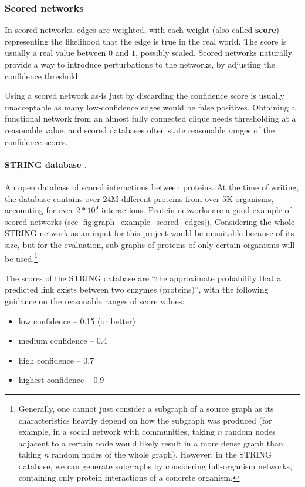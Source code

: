 \subsubsection*{Scored networks}\label{sec:scored_networks}

In scored networks, edges are weighted, with each weight (also called \textbf{score}) representing the likelihood that the edge is true in the real world.
The score is usually a real value between $0$ and $1$, possibly scaled.
Scored networks naturally provide a way to introduce perturbations to the networks, by adjusting the confidence threshold.

Using a scored network as-is just by discarding the confidence score is usually unacceptable as many low-confidence edges would be false positives.
Obtaining a functional network from an almost fully connected clique needs thresholding at a reasonable value, and scored databases often state reasonable ranges of the confidence scores.



\paragraph*{STRING database {\normalfont\cite{Szklarczyk2019}}.} An open database of scored interactions between proteins.
At the time of writing, the database contains over 24M different proteins from over 5K organisms, accounting for over $2 * 10^9$ interactions.
Protein networks are a good example of scored networks (see \cref{fig:graph_example_scored_edges}).
Considering the whole STRING network as an input for this project would be unsuitable because of its size, but for the evaluation, sub-graphs of proteins of only certain organisms will be used.\footnote{Generally, one cannot just consider a subgraph of a source graph as its characteristics heavily depend on how the subgraph was produced (for example, in a social network with communities, taking $n$ random nodes adjacent to a certain node would likely result in a more dense graph than taking $n$ random nodes of the whole graph).
However, in the STRING database, we can generate subgraphs by considering full-organism networks, containing only protein interactions of a concrete organism.}

The scores of the STRING database are \enquote{the approximate probability that a predicted link exists between two enzymes (proteins)}, with the following guidance on the reasonable ranges of score values:
\begin{itemize}[topsep=5pt,itemsep=-4pt]
    \item low confidence -- 0.15 (or better)
    \item medium confidence -- 0.4
    \item high confidence -- 0.7
    \item highest confidence -- 0.9
\end{itemize}

